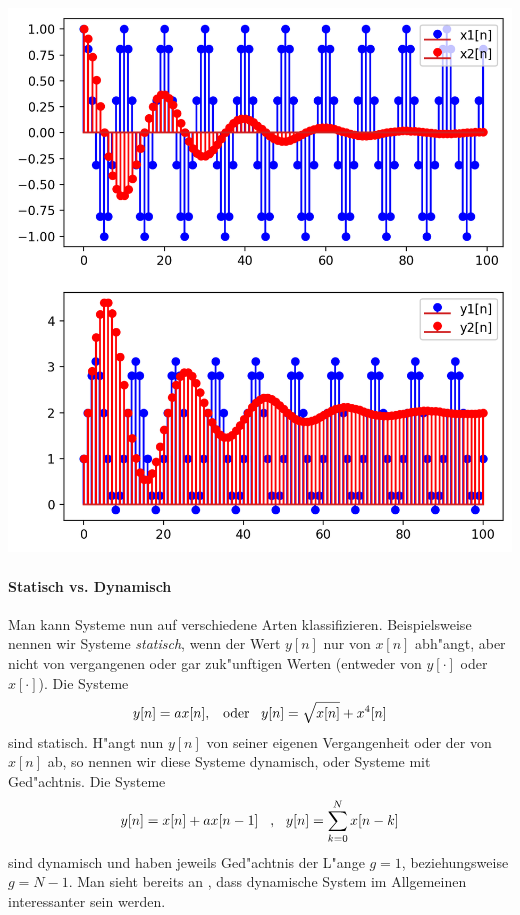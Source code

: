 \begin{listing}
    \noindent
    \begin{minipage}{0.49\textwidth}
        \strut\vspace*{-\baselineskip}\newline
        \inputminted[firstline=4,lastline=18]{python3}{code/accumulator.py}
    \end{minipage}%
    \begin{minipage}{0.49\textwidth}
        \strut\vspace*{-\baselineskip}\newline
        \includegraphics[width=\textwidth]{code/accumulator.png}
    \end{minipage}%
    \label{py:accumulator}
\end{listing}

\paragraph{Statisch vs. Dynamisch}
Man kann Systeme nun auf verschiedene Arten klassifizieren.
Beispielsweise nennen wir Systeme \emph{statisch}, wenn der Wert $y[n]$ nur von $x[n]$ abh"angt, aber nicht von vergangenen oder gar zuk"unftigen Werten (entweder von $y[\cdot]$ oder $x[\cdot]$).
Die Systeme
\[
y[n] = a x[n], {\hspace{3mm} \text{oder} \hspace{3mm}} y[n] = \sqrt{x[n]} + x^4[n]
\]
sind statisch.
H"angt nun $y[n]$ von seiner eigenen Vergangenheit oder der von $x[n]$ ab, so nennen wir diese Systeme dynamisch, oder Systeme mit Ged"achtnis.
Die Systeme
\[
y[n] = x[n] + a x[n-1] {\hspace{3mm} \text{,} \hspace{3mm}} y[n] = {\sum\limits_{k=0}^{N}{x[n-k]}}
\]
sind dynamisch und haben jeweils Ged"achtnis der L"ange $g = 1$, beziehungsweise $g = N-1$.
Man sieht bereits an , dass dynamische System im Allgemeinen interessanter sein werden.

